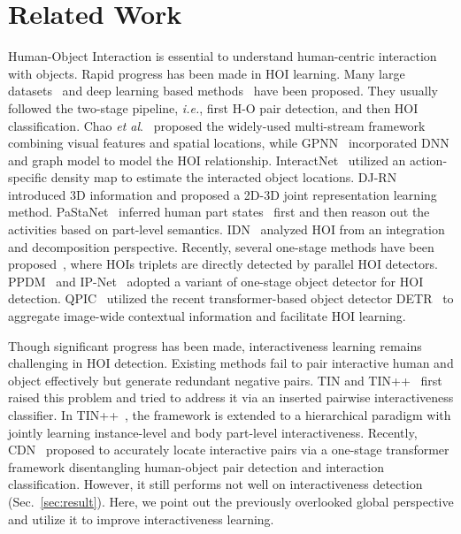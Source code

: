 \documentclass[runningheads]{llncs}
\newcommand{\etal}{\textit{et al}.}
\begin{document}
\section{Related Work}
Human-Object Interaction is essential to understand human-centric interaction with objects. Rapid progress has been made in HOI learning. Many large datasets~\cite{hicodet,vcoco,hake,openimages} and deep learning based methods~\cite{hicodet,qi2018learning,Gkioxari2017Detecting,gao2018ican,li2019transferable,li2021transferable,djrn,vcl,li2020hoi,ppdm,ipnet,qpic,cdn,liu2022highlighting,liu2022interactiveness} have been proposed. They usually followed the two-stage pipeline, \textit{i.e.}, first H-O pair detection, and then HOI classification.
Chao \etal~\cite{hicodet} proposed the widely-used multi-stream framework combining visual features and spatial locations, while GPNN~\cite{qi2018learning} incorporated DNN and graph model to model the HOI relationship. InteractNet~\cite{Gkioxari2017Detecting} utilized an action-specific density map to estimate the interacted object locations. 
DJ-RN~\cite{djrn} introduced 3D information and proposed a 2D-3D joint representation learning method. 
PaStaNet~\cite{hake} inferred human part states~\cite{lu2018beyond} first and then reason out the activities based on  part-level semantics. 
IDN~\cite{li2020hoi} analyzed HOI from an integration and decomposition perspective.
Recently, several one-stage methods have been proposed~\cite{ppdm,ipnet,qpic,cdn}, where HOIs triplets are directly detected by parallel HOI detectors.
PPDM~\cite{ppdm} and IP-Net~\cite{ipnet} adopted a variant of one-stage object detector for HOI detection. QPIC~\cite{qpic} utilized the recent transformer-based object detector DETR~\cite{detr} to aggregate image-wide contextual information and facilitate HOI learning. 

Though significant progress has been made, interactiveness learning remains challenging in HOI detection. Existing methods fail to pair interactive human and object effectively but generate redundant negative pairs. 
TIN and TIN++~\cite{li2019transferable,li2021transferable} 
first raised this problem and tried to address it via an inserted pairwise interactiveness classifier. In TIN++~\cite{li2021transferable}, the framework is extended to a hierarchical paradigm with jointly learning instance-level and body part-level interactiveness.
Recently, CDN~\cite{cdn} proposed to accurately locate interactive pairs via a one-stage transformer framework disentangling human-object pair detection and interaction classification. However, it still performs not well on interactiveness detection (Sec.~\ref{sec:result}).
Here, we point out the previously overlooked global perspective and utilize it to improve interactiveness learning.
\end{document}
